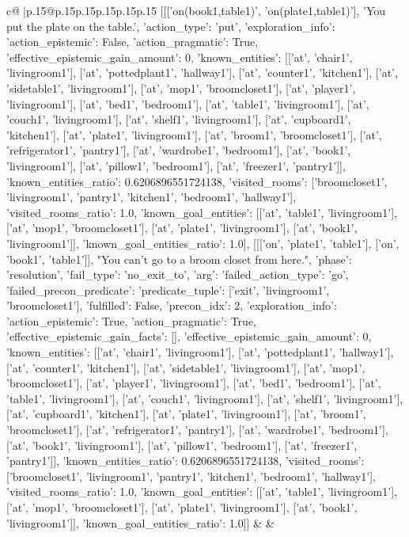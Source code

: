 \documentclass{article}
\begin{document}
{\begin{supertabular}{c@{$\;$}|p{.15\linewidth}@{}p{.15\linewidth}p{.15\linewidth}p{.15\linewidth}p{.15\linewidth}p{.15\linewidth}}
{{{	 [[['on(book1,table1)', 'on(plate1,table1)'], 'You put the plate on the table.', {'action_type': 'put', 'exploration_info': {'action_epistemic': False, 'action_pragmatic': True, 'effective_epistemic_gain_amount': 0, 'known_entities': [['at', 'chair1', 'livingroom1'], ['at', 'pottedplant1', 'hallway1'], ['at', 'counter1', 'kitchen1'], ['at', 'sidetable1', 'livingroom1'], ['at', 'mop1', 'broomcloset1'], ['at', 'player1', 'livingroom1'], ['at', 'bed1', 'bedroom1'], ['at', 'table1', 'livingroom1'], ['at', 'couch1', 'livingroom1'], ['at', 'shelf1', 'livingroom1'], ['at', 'cupboard1', 'kitchen1'], ['at', 'plate1', 'livingroom1'], ['at', 'broom1', 'broomcloset1'], ['at', 'refrigerator1', 'pantry1'], ['at', 'wardrobe1', 'bedroom1'], ['at', 'book1', 'livingroom1'], ['at', 'pillow1', 'bedroom1'], ['at', 'freezer1', 'pantry1']], 'known_entities_ratio': 0.6206896551724138, 'visited_rooms': ['broomcloset1', 'livingroom1', 'pantry1', 'kitchen1', 'bedroom1', 'hallway1'], 'visited_rooms_ratio': 1.0, 'known_goal_entities': [['at', 'table1', 'livingroom1'], ['at', 'mop1', 'broomcloset1'], ['at', 'plate1', 'livingroom1'], ['at', 'book1', 'livingroom1']], 'known_goal_entities_ratio': 1.0}}], [[['on', 'plate1', 'table1'], ['on', 'book1', 'table1']], "You can't go to a broom closet from here.", {'phase': 'resolution', 'fail_type': 'no_exit_to', 'arg': {'failed_action_type': 'go', 'failed_precon_predicate': {'predicate_tuple': ['exit', 'livingroom1', 'broomcloset1'], 'fulfilled': False, 'precon_idx': 2}}, 'exploration_info': {'action_epistemic': True, 'action_pragmatic': True, 'effective_epistemic_gain_facts': [], 'effective_epistemic_gain_amount': 0, 'known_entities': [['at', 'chair1', 'livingroom1'], ['at', 'pottedplant1', 'hallway1'], ['at', 'counter1', 'kitchen1'], ['at', 'sidetable1', 'livingroom1'], ['at', 'mop1', 'broomcloset1'], ['at', 'player1', 'livingroom1'], ['at', 'bed1', 'bedroom1'], ['at', 'table1', 'livingroom1'], ['at', 'couch1', 'livingroom1'], ['at', 'shelf1', 'livingroom1'], ['at', 'cupboard1', 'kitchen1'], ['at', 'plate1', 'livingroom1'], ['at', 'broom1', 'broomcloset1'], ['at', 'refrigerator1', 'pantry1'], ['at', 'wardrobe1', 'bedroom1'], ['at', 'book1', 'livingroom1'], ['at', 'pillow1', 'bedroom1'], ['at', 'freezer1', 'pantry1']], 'known_entities_ratio': 0.6206896551724138, 'visited_rooms': ['broomcloset1', 'livingroom1', 'pantry1', 'kitchen1', 'bedroom1', 'hallway1'], 'visited_rooms_ratio': 1.0, 'known_goal_entities': [['at', 'table1', 'livingroom1'], ['at', 'mop1', 'broomcloset1'], ['at', 'plate1', 'livingroom1'], ['at', 'book1', 'livingroom1']], 'known_goal_entities_ratio': 1.0}}]] 
	  } 
	   } 
	   } 
	 & & \\ 
 


\end{supertabular}}
\end{document}
